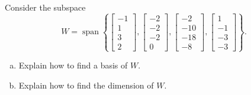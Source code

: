 
\begin{exerciseStatement}


Consider the subspace \[W=\operatorname{span}  \left\{ \left[\begin{array}{c}
-1 \\
1 \\
3 \\
2
\end{array}\right] , \left[\begin{array}{c}
-2 \\
-2 \\
-2 \\
0
\end{array}\right] , \left[\begin{array}{c}
-2 \\
-10 \\
-18 \\
-8
\end{array}\right] , \left[\begin{array}{c}
1 \\
-1 \\
-3 \\
-3
\end{array}\right] \right\} .\]


\begin{enumerate}[(a)]
\item  Explain how to find a basis of \(W\).
\item  Explain how to find the dimension of \(W\).
\end{enumerate}
    
\end{exerciseStatement}
    
